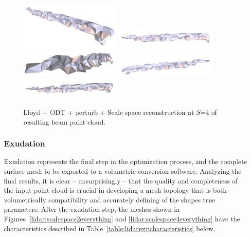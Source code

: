 \documentclass[12pt]{drexelthesis}
\let\Oldsubsubsection\subsubsection
\renewcommand{\subsubsection}{\FloatBarrier\Oldsubsubsection}
\begin{document}
\begin{figure}[!ht]
	\centering
		\includegraphics[width=2in]{real-lab-scans/meshed/optimized/scalespace4lloydodtperturb00.png}
		\includegraphics[width=2in]{real-lab-scans/meshed/optimized/scalespace4lloydodtperturb01.png}
		\includegraphics[width=2in]{real-lab-scans/meshed/optimized/scalespace4lloydodtperturb02.png}
		\includegraphics[width=2in]{real-lab-scans/meshed/optimized/scalespace4lloydodtperturb03.png}
		\includegraphics[width=2in]{real-lab-scans/meshed/optimized/scalespace4lloydodtperturb04.png}
		\caption[Lloyd + ODT + perturb + Scale space reconstruction at $S$=4 of segmented LiDAR data]{\centering Lloyd + ODT + perturb + Scale space reconstruction at $S$=4 of resulting beam point cloud.}
	\label{lidar:scalespace4lloydodtperturb}
\end{figure}

\subsubsection{Exudation}

Exudation represents the final step in the optimization process, and the complete surface mesh to be exported to a volumetric conversion software. Analyzing the final results, it is clear -- unsurprisingly -- that the quality and completeness of the input point cloud is crucial in developing a mesh topology that is both volumetrically compatibility and accurately defining of the shapes true parameters. After the exudation step, the meshes shown in Figures~\ref{lidar:scalespace2everything} and \ref{lidar:scalespace4everything} have the characteristics described in Table~\ref{table:lidarexitcharacteristics} below.
\end{document}
